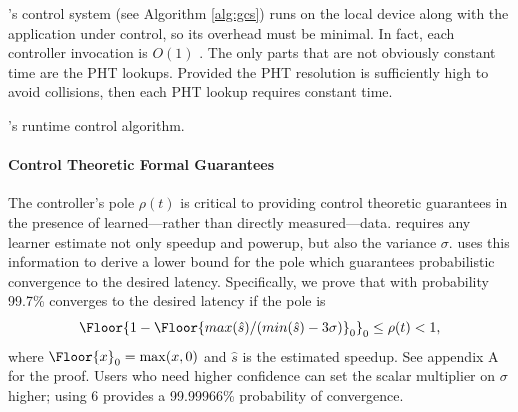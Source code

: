 \SYSTEM{}'s control system (see Algorithm \ref{alg:gcs}) runs on the
local device along with the application under control, so its overhead
must be minimal.  In fact, each controller invocation is $O(1)$ .  The
only parts that are not obviously constant time are the PHT lookups.
Provided the PHT resolution is sufficiently high to avoid collisions,
then each PHT lookup requires constant time.
\begin{algorithm}[t]
\caption{\SYSTEM{}'s runtime control algorithm.}
\label{alg:gcs}
\end{algorithm}

\paragraph{Control Theoretic Formal Guarantees}

The controller's pole $\rho(t)$ is critical to providing control
theoretic guarantees in the presence of learned---rather than directly
measured---data.  \SYSTEM{} requires any learner estimate not only
speedup and powerup, but also the variance $\sigma$.  \SYSTEM{} uses
this information to derive a lower bound for the pole which guarantees
probabilistic convergence to the desired latency. Specifically, we
prove that with probability 99.7\% \SYSTEM{} converges to the desired
latency if the pole is
$$\Floor{1- \Floor{max(\hat{s})/(min(\hat{s}) - 3\sigma)}_0}_0 \leq \rho(t)
< 1,$$ where $\Floor{x}_0 = \max(x,0)$ and $\hat{s}$ is the estimated
speedup. See appendix A for the proof. Users who need higher
confidence can set the scalar multiplier on $\sigma$ higher; \eg{}
using $6$ provides a 99.99966\% probability of convergence.

